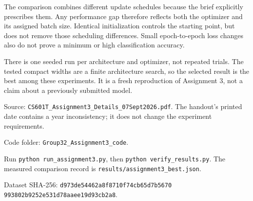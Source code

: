 \documentclass[11pt,a4paper]{article}
\begin{document}
The comparison combines different update schedules because the brief explicitly prescribes them. Any performance gap therefore reflects both the optimizer and its assigned batch size. Identical initialization controls the starting point, but does not remove those scheduling differences. Small epoch-to-epoch loss changes also do not prove a minimum or high classification accuracy.


There is one seeded run per architecture and optimizer, not repeated trials. The tested compact widths are a finite architecture search, so the selected result is the best among these experiments. It is a fresh reproduction of Assignment 3, not a claim about a previously submitted model.


Source: \nolinkurl{CS601T_Assignment3_Details_07Sept2026.pdf}. The handout's printed date contains a year inconsistency; it does not change the experiment requirements.


Code folder: \texttt{Group32\_Assignment3\_code}.


Run \texttt{python run\_assignment3.py}, then \texttt{python verify\_results.py}. The measured comparison record is \nolinkurl{results/assignment3_best.json}.


Dataset SHA-256: \texttt{d973de54462a8f8710f74cb65d7b5670}\\ \texttt{993802b9252e531d78aaee19d93cb2a8}.
\end{document}
